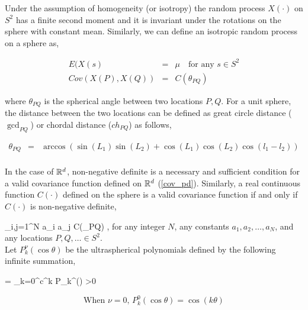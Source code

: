 	
	
	Under the assumption of homogeneity (or isotropy) the random process $X(\cdot)$ on $S^2$ has a finite second moment and it is invariant under the rotations on the sphere with constant mean. Similarly, we can define an isotropic random process on a sphere as, 
	
	\begin{eqnarray*}
		E(X(s) &=& \mu \quad \mbox{for any } s\in S^2 \\
		Cov(X(P),X(Q)) &=& C(\theta_{PQ}) 
	\end{eqnarray*}
	
	where $\theta_{PQ}$ is the spherical angle between two locations $P,Q$. For a unit sphere, the distance between the two locations can be defined as great circle distance ($\gcd_{PQ}$) or chordal distance ($ch_{PQ}$) as follows,
	
	\begin{eqnarray*}
		\theta_{PQ}  &=& \arccos\left(\sin(L_1)\sin(L_2) + \cos(L_1)\cos(L_2)\cos(l_1-l_2)\right)\\
	\end{eqnarray*}
	
	In the case of $\mathbb{R}^d$, non-negative definite is a necessary and sufficient condition for a valid covariance function defined on $\mathbb{R}^d$ (\ref{cov_pd}). Similarly, a real continuous function $C(\cdot)$ defined on the sphere is a valid covariance function if and only if $C(\cdot)$ is non-negative definite,
	
	\beq
	\sum_{i,j=1}^{N} a_i a_j C(\theta_{PQ}) ,
	\eeq
	for any integer $N$, any constants $a_1, a_2, \ldots, a_N$, and any locations $P, Q, \ldots \in S^2$.\\
	
	Let $P_{k}^{\nu}(\cos\theta)$ be the ultraspherical polynomials defined by the following infinite summation,
	
	\beq
	 = \sum_{k=0}^{\infty}c^{k} P_{k}^{\nu}(\cos\theta) \quad \nu>0
	\eeq
	
	
	\[
		\mbox{When $\nu = 0$, } P_{k}^{0}(\cos\theta) = \cos (k\theta)
	\]
	
